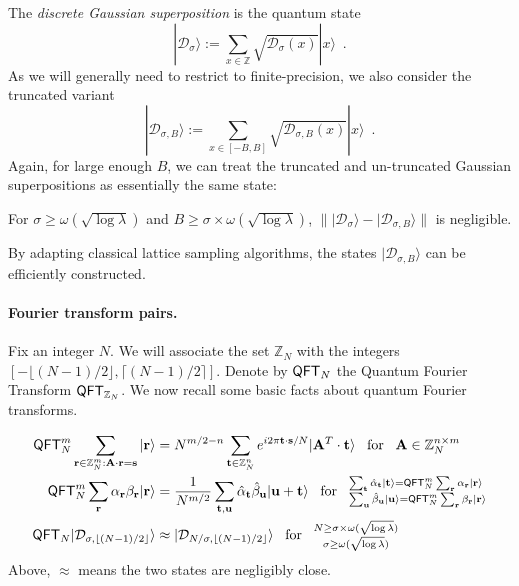 \documentclass{article}\usepackage[a4paper,margin=20mm]{geometry}
\numberwithin{theorem}{section}
\numberwithin{equation}{section}
\newcommand{\Z}{\mathbb{Z}}
\newcommand{\rv}{{\mathbf{r}}}
\newcommand{\sv}{{\mathbf{s}}}
\newcommand{\tv}{{\mathbf{t}}}
\newcommand{\uv}{{\mathbf{u}}}
\newcommand{\Am}{{\mathbf{A}}}
\newcommand{\Ds}{{\mathcal{D}}}
\newcommand{\QFT}{{\sf QFT}}
\begin{document}
\medskip

\noindent The \emph{discrete Gaussian superposition} is the quantum state
\[|\Ds_\sigma\rangle:=\sum_{x\in\Z}\sqrt{\Ds_\sigma(x)}|x\rangle\enspace .\]
As we will generally need to restrict to finite-precision, we also consider the truncated variant
\[|\Ds_{\sigma,B}\rangle:=\sum_{x\in[-B,B]}\sqrt{\Ds_{\sigma,B}(x)}|x\rangle\enspace .\]
Again, for large enough $B$, we can treat the truncated and un-truncated Gaussian superpositions as essentially the same state:
\begin{fact}For $\sigma\geq\omega(\sqrt{\log\lambda})$ and  $B\geq \sigma\times\omega(\sqrt{\log\lambda})$, $\||\Ds_\sigma\rangle-|\Ds_{\sigma,B}\rangle\|$ is negligible.
\end{fact}
\noindent By adapting classical lattice sampling algorithms, the states $|\Ds_{\sigma,B}\rangle$ can be efficiently constructed. 


\paragraph{Fourier transform pairs.} Fix an integer $N$. We will associate the set $\Z_N$ with the integers $[-\lfloor (N-1)/2\rfloor,\lceil (N-1)/2\rceil]$. Denote by $\QFT_N$ the Quantum Fourier Transform $\QFT_{\Z_N}$. We now recall some basic facts about quantum Fourier transforms. 

\begin{align*}
	\QFT_N^m\sum_{\rv\in\Z_N^m:\Am\cdot\rv=\sv}|\rv\rangle&=N^{m/2-n}\sum_{\tv\in\Z_N^n}e^{i2\pi \tv\cdot\sv/N }|\Am^T\cdot \tv\rangle\hspace{0.5em}\text{ for }\hspace{0.5em}\Am\in\Z_N^{n\times m}\\
	\QFT_N^m\sum_{\rv}\alpha_\rv\beta_\rv|\rv\rangle&=\frac{1}{N^{m/2}}\sum_{\tv,\uv}\hat{\alpha}_\tv\hat{\beta}_\uv|\uv+\tv\rangle\hspace{0.5em}\text{ for }\hspace{0.5em}\begin{subarray}{l}\sum_\tv\hat{\alpha}_\tv|\tv\rangle=\QFT_N^m\sum_\rv\alpha_\rv|\rv\rangle\\\sum_\uv\hat{\beta}_\uv|\uv\rangle=\QFT_N^m\sum_\rv\beta_\rv|\rv\rangle\end{subarray}\\
	\QFT_N |\Ds_{\sigma,\lfloor (N-1)/2\rfloor}\rangle&\approx|\Ds_{N/\sigma,\lfloor (N-1)/2\rfloor}\rangle\hspace{0.5em}\text{ for }\hspace{0.5em}\begin{subarray}{c}N\geq \sigma\times\omega(\sqrt{\log\lambda})\\ \sigma\geq\omega(\sqrt{\log\lambda})\end{subarray}
\end{align*}
Above, $\approx$ means the two states are negligibly close.
\end{document}
